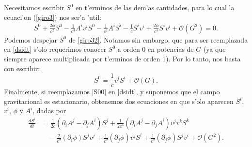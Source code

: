 Necesitamos escribir $S^0$ en t'erminos de las dem'as cantidades, para lo cual la ecuaci'on (\ref{giro3}) nos ser'a 'util:
\begin{align}
S^0+\frac{2\phi}{c^2}S^0-\frac{1}{c^3}A^iv^iS^0-\frac{1}{c^2}A^iS^i-\frac{1}{c}S^iv^i 
+\frac{2\phi}{c^3}S^iv^i+\mathcal{O}(G^2)=0.\label{giro32}
\end{align}
Podemos despejar $S^0$ de \eqref{giro32}. Notamos sin embargo, que para ser reemplazada en \eqref{dsidt} s'olo requerimos conocer $S^0$ a orden 0 en potencias de $G$ (ya que siempre aparece multiplicada por t'erminos de orden 1). Por lo tanto, nos basta con escribir:
\begin{equation}
S^0=\frac{1}{c}v^iS^i +\mathcal{O}(G).\label{S00}
\end{equation}
Finalmente, si reemplazamos \eqref{S00} %
en \eqref{dsidt}, y suponemos que el campo gravitacional es estacionario, 
obtenemos dos ecuaciones en que s'olo aparecen $S^i$, $v^i$, $\phi$ y $A^i$, dadas por
\begin{align}
\frac{dS^{i}}{dt} &= \frac{1}{2c}\left(\partial_iA^j-\partial_jA^i\right)S^j + \frac{1}{2c^3}(\partial_iA^j-\partial_jA^i)v^jv^kS^k \nonumber \\
&\quad  -\frac{2}{c^2}(\partial_i\phi) S^jv^j+\frac{1}{c^2}(\partial_j\phi)v^jS^i+\frac{1}{c^2}(\partial_j\phi)S^jv^i+\mathcal{O}(G^2).\label{dsidt2}
\end{align}
